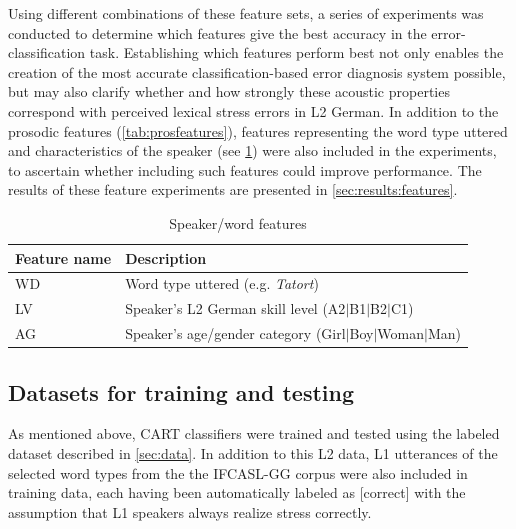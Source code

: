 \documentclass[a4paper]{article}
\begin{document}
	   
		
		 Using different combinations of these feature sets, a series of experiments was conducted to determine which features give the best accuracy in the error-classification task. Establishing which features perform best not only enables the creation of the most accurate classification-based error diagnosis system possible, but may also clarify whether and how strongly these acoustic properties correspond with perceived lexical stress errors in L2 German.
		 In addition to the prosodic features (\cref{tab:prosfeatures}), features representing the word type uttered and characteristics of the speaker (see \cref{tab:spkrfeatures}) were also included in the experiments, to ascertain whether including such features could improve performance.
		The results of these feature experiments are presented in \cref{sec:results:features}.
		
		\begin{table}
			\centering
			\caption{Speaker/word features}
			\begin{tabularx}{\columnwidth}{lX}
			\toprule
			Feature name & Description \\
			\midrule
			WD %
				& Word type uttered (e.g. \textit{Tatort}) \\
			LV %
				& Speaker's L2 German skill level \newline (A2$|$B1$|$B2$|$C1)\\
			AG %
				& Speaker's age/gender category \newline (Girl$|$Boy$|$Woman$|$Man)\\
			\bottomrule
			\end{tabularx}
			\label{tab:spkrfeatures}		
		\end{table}
	    
	    
	    \subsection{Datasets for training and testing}
	    \label{sec:method:datasets}

		As mentioned above, CART classifiers were trained and tested using the labeled dataset described in \cref{sec:data}. In addition to this L2 data, L1 utterances of the selected word types from the the IFCASL-GG corpus were also included in training data, each having been automatically labeled as [correct] with the assumption that L1 speakers always realize stress correctly.
\end{document}
